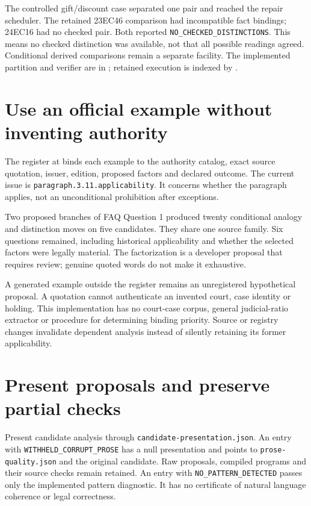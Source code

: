 The controlled gift/discount case separated one pair and reached the repair
scheduler. The retained 23EC46 comparison had incompatible fact bindings;
24EC16 had no checked pair. Both reported \texttt{NO\_CHECKED\_DISTINCTIONS}.
This means no checked distinction was available, not that all possible readings
agreed. Conditional derived comparisons remain a separate facility. The
implemented partition and verifier are in
; retained execution
is indexed by .

\section{Use an official example without inventing authority}

The register at  binds each
example to the authority catalog, exact source quotation, issuer, edition,
proposed factors and declared outcome. The current issue is
\texttt{paragraph.3.11.applicability}. It concerns whether the paragraph applies,
not an unconditional prohibition after exceptions.

Two proposed branches of FAQ Question 1 produced twenty conditional analogy
and distinction moves on five candidates. They share one source family. Six
questions remained, including historical applicability and whether the selected
factors were legally material. The factorization is a developer proposal that
requires review; genuine quoted words do not make it exhaustive.

A generated example outside the register remains an unregistered hypothetical
proposal. A quotation cannot authenticate an invented court, case identity or
holding. This implementation has no court-case corpus, general judicial-ratio
extractor or procedure for determining binding priority. Source or registry
changes invalidate dependent analysis instead of silently retaining its former
applicability.

\section{Present proposals and preserve partial checks}

Present candidate analysis through \texttt{candidate-presentation.json}.
An entry with \texttt{WITHHELD\_CORRUPT\_PROSE} has a null presentation and points
to \texttt{prose-quality.json} and the original candidate. Raw proposals,
compiled programs and their source checks remain retained. An entry with
\texttt{NO\_PATTERN\_DETECTED} passes only the implemented pattern diagnostic.
It has no certificate of natural language coherence or legal correctness.

